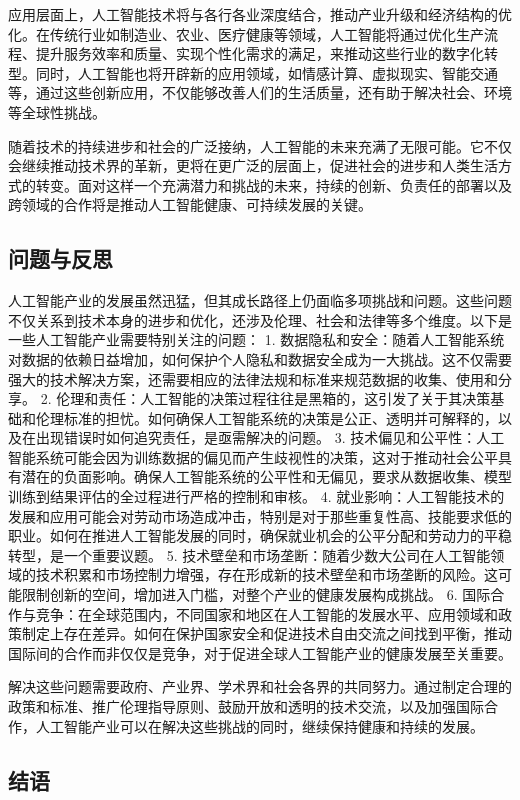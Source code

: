 应用层面上，人工智能技术将与各行各业深度结合，推动产业升级和经济结构的优化。在传统行业如制造业、农业、医疗健康等领域，人工智能将通过优化生产流程、提升服务效率和质量、实现个性化需求的满足，来推动这些行业的数字化转型。同时，人工智能也将开辟新的应用领域，如情感计算、虚拟现实、智能交通等，通过这些创新应用，不仅能够改善人们的生活质量，还有助于解决社会、环境等全球性挑战。

随着技术的持续进步和社会的广泛接纳，人工智能的未来充满了无限可能。它不仅会继续推动技术界的革新，更将在更广泛的层面上，促进社会的进步和人类生活方式的转变。面对这样一个充满潜力和挑战的未来，持续的创新、负责任的部署以及跨领域的合作将是推动人工智能健康、可持续发展的关键。

\subsection{问题与反思}
人工智能产业的发展虽然迅猛，但其成长路径上仍面临多项挑战和问题。这些问题不仅关系到技术本身的进步和优化，还涉及伦理、社会和法律等多个维度。以下是一些人工智能产业需要特别关注的问题：
1. 数据隐私和安全：随着人工智能系统对数据的依赖日益增加，如何保护个人隐私和数据安全成为一大挑战。这不仅需要强大的技术解决方案，还需要相应的法律法规和标准来规范数据的收集、使用和分享。
2. 伦理和责任：人工智能的决策过程往往是黑箱的，这引发了关于其决策基础和伦理标准的担忧。如何确保人工智能系统的决策是公正、透明并可解释的，以及在出现错误时如何追究责任，是亟需解决的问题。
3. 技术偏见和公平性：人工智能系统可能会因为训练数据的偏见而产生歧视性的决策，这对于推动社会公平具有潜在的负面影响。确保人工智能系统的公平性和无偏见，要求从数据收集、模型训练到结果评估的全过程进行严格的控制和审核。
4. 就业影响：人工智能技术的发展和应用可能会对劳动市场造成冲击，特别是对于那些重复性高、技能要求低的职业。如何在推进人工智能发展的同时，确保就业机会的公平分配和劳动力的平稳转型，是一个重要议题。
5. 技术壁垒和市场垄断：随着少数大公司在人工智能领域的技术积累和市场控制力增强，存在形成新的技术壁垒和市场垄断的风险。这可能限制创新的空间，增加进入门槛，对整个产业的健康发展构成挑战。
6. 国际合作与竞争：在全球范围内，不同国家和地区在人工智能的发展水平、应用领域和政策制定上存在差异。如何在保护国家安全和促进技术自由交流之间找到平衡，推动国际间的合作而非仅仅是竞争，对于促进全球人工智能产业的健康发展至关重要。

解决这些问题需要政府、产业界、学术界和社会各界的共同努力。通过制定合理的政策和标准、推广伦理指导原则、鼓励开放和透明的技术交流，以及加强国际合作，人工智能产业可以在解决这些挑战的同时，继续保持健康和持续的发展。

\subsection{结语}

